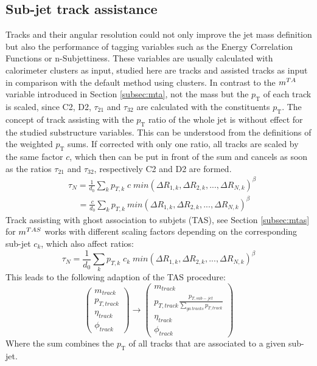
\subsection{Sub-jet track assistance}\label{subsec:ta_adapt}
Tracks and their angular resolution could not only improve the jet mass definition but also the performance of tagging variables such as the Energy Correlation Functions or n-Subjettiness. These variables are usually calculated with calorimeter clusters as input, studied here are tracks and assisted tracks as input in comparison with the default method using clusters. 
In contrast to the $m^{TA}$ variable introduced in Section \ref{subsec:mta}, not the mass but the $p_{\mathrm{T}}$ of each track is scaled, since C2, D2, $\tau_{21}$ and $\tau_{32}$ are calculated with the constituents $p_{\mathrm{T}}$.
The concept of track assisting with the $p_{\mathrm{T}}$ ratio of the whole jet is without effect for the studied substructure variables. This can be understood from the definitions of the weighted $p_{\mathrm{T}}$ sums. If corrected with only one ratio, all tracks are scaled by the same factor $c$, which then can be put in front of the sum and cancels as soon as the ratios $\tau_{21}$ and $\tau_{32}$, respectively C2 and D2 are formed.
\begin{equation}
\begin{aligned}
 & \tau_N ={} \frac{1}{d_0}\sum_k p_{T,k} \; c \; min(\Delta R_{1,k},\Delta R_{2,k},...,\Delta R_{N,k})^{\beta} \\
 & \; \; \; \;  ={} \frac{c}{d_0}\sum_k p_{T,k}\:min(\Delta R_{1,k},\Delta R_{2,k},...,\Delta R_{N,k})^{\beta}
\end{aligned}
\end{equation}
Track assisting with ghost association to subjets (TAS), see Section \ref{subsec:mtas} for $m^{TAS}$ works with different scaling factors depending on the corresponding sub-jet $c_k$, which also affect ratios:
\begin{equation}
\tau_N = \frac{1}{d_0}\sum_k p_{T,k} \; c_k \; min(\Delta R_{1,k},\Delta R_{2,k},...,\Delta R_{N,k})^{\beta} 
\end{equation}\label{eq:tas_ta}
This leads to the following adaption of the TAS procedure:
\begin{equation}
\begin{pmatrix}
                    m_{track} \\ p_{T,track} \\ \eta_{track} \\  \phi_{track}
                    \end{pmatrix}       \rightarrow \begin{pmatrix}
                    m_{track}  \\ p_{T,track}  \frac{p_{T,sub-jet}}{\sum\limits_{ga\:tracks}p_{T,track}} \\ \eta_{track} \\ \phi_{track}
            
            \end{pmatrix}  
\end{equation}\label{eq:track_tas}
Where the sum combines the $p_{\mathrm{T}}$ of all tracks that are associated to a given sub-jet. 


